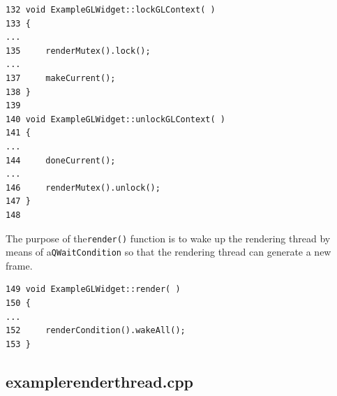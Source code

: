\documentclass[prodmode,acmtopc]{acmsmall}
\begin{document}
\begin{lstlisting}
132 void ExampleGLWidget::lockGLContext( )
133 {
...
135     renderMutex().lock();
...
137     makeCurrent();
138 }
139
140 void ExampleGLWidget::unlockGLContext( )
141 {
...
144     doneCurrent();
...
146     renderMutex().unlock();
147 }
148
\end{lstlisting}
%
The purpose of the\lstinline|render()| function is to wake up the rendering
thread by means of a\lstinline|QWaitCondition| so that the rendering thread can
generate a new frame.
%
\begin{lstlisting}
149 void ExampleGLWidget::render( )
150 {
...
152     renderCondition().wakeAll();
153 }
\end{lstlisting}

\subsection{examplerenderthread.cpp}
\end{document}

